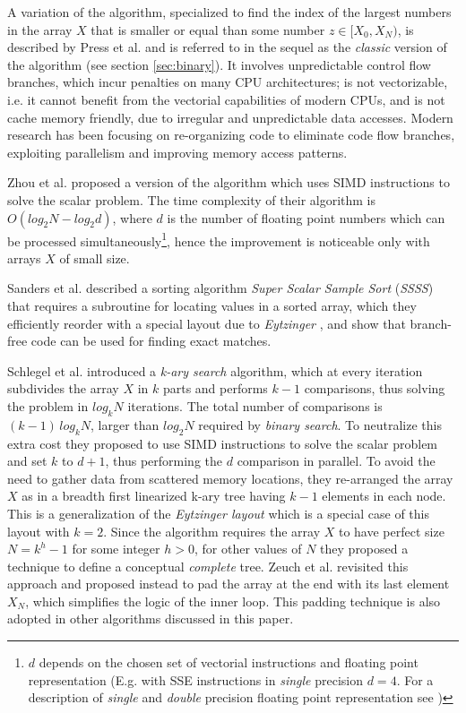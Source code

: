 \documentclass[preprint,1p,times]{elsarticle}
\begin{document}
A variation of the algorithm, specialized to find the index of the largest numbers in the array $X$ that is smaller or equal than some number $z\in[X_0,X_N)$, is described by Press et al. \cite{NRC++} and is referred to in the sequel as the \textit{classic} version of the algorithm (see section \ref{sec:binary}). It involves unpredictable control flow branches, which incur penalties on many CPU architectures; is not vectorizable, i.e. it cannot benefit from the vectorial capabilities of modern CPUs, and is not cache memory friendly, due to irregular and unpredictable data accesses. Modern research has been focusing on re-organizing code to eliminate code flow branches, exploiting parallelism and improving memory access patterns.

Zhou et al. \cite{Zhou2002} proposed a version of the algorithm which uses SIMD instructions to solve the scalar problem. The time complexity of their algorithm is $O(log_2N-log_2d)$, where $d$ is the number of floating point numbers which can be processed simultaneously\footnote{$d$ depends on the chosen set of vectorial instructions and floating point representation (E.g. with SSE instructions in \textit{single} precision $d=4$. For a description of \textit{single} and \textit{double} precision floating point representation see \cite{IEE754})}, hence the improvement is noticeable only with arrays $X$ of small size.

Sanders et al. \cite{Sanders2004} described a sorting algorithm \textit{Super Scalar Sample Sort}
(\textit{SSSS}) that requires a subroutine for locating values in a sorted array, which they efficiently reorder with a special layout due to \textit{Eytzinger} \cite{Eytzinger1590}, and show that branch-free code can be used for finding exact matches.

Schlegel et al. \cite{kary2009} introduced a \textit{k-ary search} algorithm, which at every iteration subdivides the array $X$ in $k$ parts and performs $k-1$ comparisons, thus solving the problem in $log_kN$ iterations. The total number of comparisons is $(k-1)\,log_kN$, larger than $log_2N$ required by \textit{binary search}. To neutralize this extra cost they proposed to use SIMD instructions to solve the scalar problem and set $k$ to $d+1$, thus performing the $d$ comparison in parallel. To avoid the need to gather data from scattered memory locations, they re-arranged the array $X$ as in a breadth first linearized k-ary tree having $k-1$ elements in each node. This is a generalization of the \textit{Eytzinger layout} which is a special case of this layout with $k=2$. Since the algorithm requires the array $X$ to have perfect size $N=k^h-1$ for some integer $h>0$, for other values of $N$ they proposed a technique to define a conceptual \textit{complete} tree. Zeuch et al. \cite{kary2014} revisited this approach and proposed instead to pad the array at the end with its last element $X_N$, which simplifies the logic of the inner loop. This padding technique is also adopted in other algorithms discussed in this paper.
\end{document}
